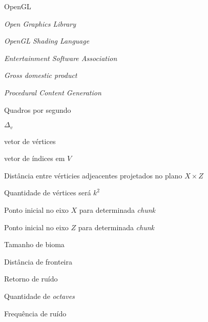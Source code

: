 \documentclass[tg]{mdtuffs}
\begin{document}
\begin{listofabbrv}{OpenGL}
    \item [OpenGL] \textit{Open Graphics Library}
    \item [GLSL] \textit{OpenGL Shading Language}
    \item [ESA] \textit{Entertainment Software Association}
    \item [GDP] \textit{Gross domestic product}
    \item [PCG] \textit{Procedural Content Generation}
    \item [fps] Quadros por segundo
    
\end{listofabbrv}


\begin{listofsymbols}{$\Delta_{v}$}
    \item [$V$] vetor de vértices
    \item [$E$] vetor de índices em $V$
    \item [$\Delta_{v}$] Distância entre vérticies adjeacentes projetados no plano $X \times Z$
    \item [$k$] Quantidade de vértices será $k^2$
    \item [$x_{s}$] Ponto inicial no eixo $X$ para determinada \textit{chunk}
    \item [$z_{s}$] Ponto inicial no eixo $Z$ para determinada \textit{chunk}
    \item [$b$] Tamanho de bioma
    \item [$l$] Distância de fronteira
    \item [$h'$] Retorno de ruído
    \item [$\theta$] Quantidade de \textit{octaves}
    \item [$f$] Frequência de ruído
    
\end{listofsymbols}
\end{document}
